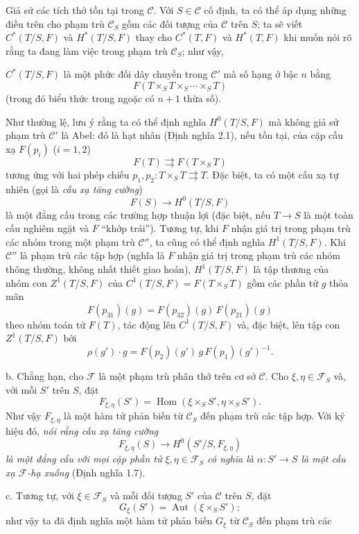 \documentclass[11pt,twoside,openany]{book}
\numberwithin{equation}{section}
\newcommand{\src}[1]{%
  \phantomsection\hypertarget{src:\fgasourceid:#1}{}%
  \marginpar{\raggedleft\footnotesize\sffamily #1}%
}
\newcommand{\fgasourceid}{unset}
\begin{document}
Giả sử các tích thớ tồn tại trong $\mathcal C$. Với $S\in\mathcal C$ cố định,
ta có thể áp dụng những điều trên cho phạm trù $\mathcal C_S$ gồm các đối tượng
của $\mathcal C$ trên $S$; ta sẽ viết $C^*(T/S,F)$ và $H^*(T/S,F)$ thay cho
$C^*(T,F)$ và $H^*(T,F)$ khi muốn nói rõ rằng ta đang làm việc trong phạm trù
$\mathcal C_S$; như vậy,

\src{311}
$C^*(T/S,F)$ là một phức đối dây chuyền trong $\mathcal C'$ mà số hạng ở bậc
$n$ bằng
\[
  F(T\times_ST\times_S\cdots\times_ST)
\]
(trong đó biểu thức trong ngoặc có $n+1$ thừa số).

Như thường lệ, lưu ý rằng ta có thể định nghĩa $H^0(T/S,F)$ mà không giả sử
phạm trù $\mathcal C'$ là Abel: đó là hạt nhân (Định nghĩa 2.1), nếu tồn tại,
của cặp cấu xạ $F(p_i)$ ($i=1,2$)
\[
  F(T)\rightrightarrows F(T\times_ST)
\]
tương ứng với hai phép chiếu
$p_1,p_2:T\times_ST\rightrightarrows T$. Đặc biệt, ta có một cấu xạ tự nhiên
(gọi là \emph{cấu xạ tăng cường})
\[
  F(S)\longrightarrow H^0(T/S,F)
\]
là một đẳng cấu trong các trường hợp thuận lợi (đặc biệt, nếu
$T\longrightarrow S$ là một toàn cấu nghiêm ngặt và $F$ “khớp trái”).
Tương tự, khi $F$ nhận giá trị trong phạm trù các nhóm trong một phạm trù
$\mathcal C''$, ta cũng có thể định nghĩa $H^1(T/S,F)$. Khi $\mathcal C''$ là
phạm trù các tập hợp (nghĩa là $F$ nhận giá trị trong phạm trù các nhóm thông
thường, không nhất thiết giao hoán), $H^1(T/S,F)$ là tập thương của nhóm con
$Z^1(T/S,F)$ của $C^1(T/S,F)=F(T\times_ST)$ gồm các phần tử $g$ thỏa mãn
\[
  F(p_{31})(g)=F(p_{32})(g)\,F(p_{21})(g)
\]
theo nhóm toán tử $F(T)$, tác động lên $C^1(T/S,F)$ và, đặc biệt, lên tập con
$Z^1(T/S,F)$ bởi
\[
  \rho(g')\cdot g=F(p_2)(g')\,g\,F(p_1)(g')^{-1}.
\]

\medskip\noindent
b. Chẳng hạn, cho $\mathcal F$ là một phạm trù phân thớ trên cơ sở
$\mathcal C$. Cho $\xi,\eta\in\mathcal F_S$ và, với mỗi $S'$ trên $S$, đặt
\[
  F_{\xi,\eta}(S')=
  \operatorname{Hom}(\xi\times_SS',\eta\times_SS').
\]
Như vậy $F_{\xi,\eta}$ là một hàm tử phản biến từ $\mathcal C_S$ đến phạm trù
các tập hợp. Với ký hiệu đó, \emph{nói rằng cấu xạ tăng cường}
\[
  F_{\xi,\eta}(S)\longrightarrow H^0(S'/S,F_{\xi,\eta})
\]
\emph{là một đẳng cấu với mọi cặp phần tử
$\xi,\eta\in\mathcal F_S$ có nghĩa là
$\alpha:S'\longrightarrow S$ là một cấu xạ $\mathcal F$-hạ xuống}
(Định nghĩa 1.7).

\medskip\noindent
c. Tương tự, với $\xi\in\mathcal F_S$ và mỗi đối tượng $S'$ của $\mathcal C$
trên $S$, đặt
\[
  G_\xi(S')=\operatorname{Aut}(\xi\times_SS') ;
\]
như vậy ta đã định nghĩa một hàm tử phản biến $G_\xi$ từ $\mathcal C_S$ đến
phạm trù các
\end{document}
